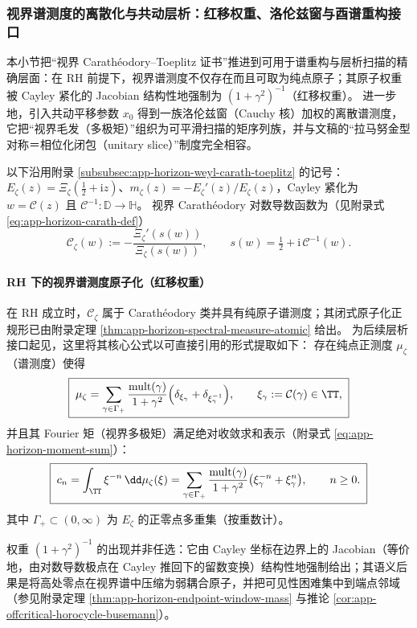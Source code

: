 \subsubsection{视界谱测度的离散化与共动层析：红移权重、洛伦兹窗与酉谱重构接口}\label{subsubsec:xi-horizon-spectral-measure-tomography}
本小节把“视界 Carath\'eodory--Toeplitz 证书”推进到可用于谱重构与层析扫描的精确层面：在 RH 前提下，视界谱测度不仅存在而且可取为纯点原子；其原子权重被 Cayley 紧化的 Jacobian 结构性地强制为 \((1+\gamma^{2})^{-1}\)（红移权重）。
进一步地，引入共动平移参数 \(x_0\) 得到一族洛伦兹窗（Cauchy 核）加权的离散谱测度，它把“视界毛发（多极矩）”组织为可平滑扫描的矩序列族，并与文稿的“拉马努金型对称＝相位化闭包（unitary slice）”制度完全相容。
\par
以下沿用附录 \ref{subsubsec:app-horizon-weyl-carath-toeplitz} 的记号：\(E_{\zeta}(z)=\Xi_{\zeta}(\tfrac12+\mathrm{i}z)\)、\(m_{\zeta}(z)=-E_{\zeta}'(z)/E_{\zeta}(z)\)，Cayley 紧化为 \(w=\mathcal{C}(z)\) 且 \(\mathcal{C}^{-1}:\mathbb{D}\to\mathbb{H}\)。
视界 Carath\'eodory 对数导数函数为（见附录式 \eqref{eq:app-horizon-carath-def}）
\[
  \mathscr{C}_{\zeta}(w):=-\frac{\Xi_{\zeta}'(s(w))}{\Xi_{\zeta}(s(w))},
  \qquad s(w)=\tfrac12+\mathrm{i}\,\mathcal{C}^{-1}(w).
\]

\paragraph{RH 下的视界谱测度原子化（红移权重）}
在 RH 成立时，\(\mathscr{C}_{\zeta}\) 属于 Carath\'eodory 类并具有纯原子谱测度；其闭式原子化正规形已由附录定理 \ref{thm:app-horizon-spectral-measure-atomic} 给出。
为后续层析接口起见，这里将其核心公式以可直接引用的形式提取如下：
存在纯点正测度 \(\mu_{\zeta}\)（谱测度）使得
\begin{equation}\label{eq:xi-horizon-mu-atomic-recall}
\boxed{\;
\mu_{\zeta}
=
\sum_{\gamma\in\Gamma_+}\frac{\mathrm{mult}(\gamma)}{1+\gamma^2}\Bigl(\delta_{\xi_{\gamma}}+\delta_{\xi_{\gamma}^{-1}}\Bigr),
\qquad \xi_{\gamma}:=\mathcal{C}(\gamma)\in\TT,
\;}
\end{equation}
并且其 Fourier 矩（视界多极矩）满足绝对收敛求和表示（附录式 \eqref{eq:app-horizon-moment-sum}）：
\begin{equation}\label{eq:xi-horizon-moment-sum-recall}
\boxed{\;
c_n=\int_{\TT}\xi^{-n}\,\dd\mu_{\zeta}(\xi)
=
\sum_{\gamma\in\Gamma_+}\frac{\mathrm{mult}(\gamma)}{1+\gamma^2}\bigl(\xi_{\gamma}^{-n}+\xi_{\gamma}^{n}\bigr),
\qquad n\ge 0.
\;}
\end{equation}
其中 \(\Gamma_+\subset(0,\infty)\) 为 \(E_{\zeta}\) 的正零点多重集（按重数计）。
\par
权重 \((1+\gamma^2)^{-1}\) 的出现并非任选：它由 Cayley 坐标在边界上的 Jacobian（等价地，由对数导数极点在 Cayley 推回下的留数变换）结构性地强制给出；其语义后果是将高处零点在视界谱中压缩为弱耦合原子，并把可见性困难集中到端点邻域（参见附录定理 \ref{thm:app-horizon-endpoint-window-mass} 与推论 \ref{cor:app-offcritical-horocycle-busemann}）。

